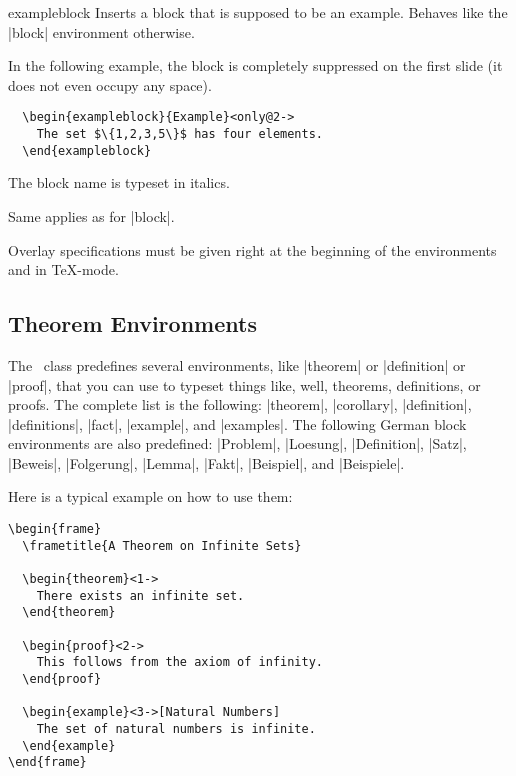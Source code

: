 \begin{environment}{{exampleblock}} 
  Inserts a block that is supposed to be an example. Behaves like the
  |block| environment otherwise.
  
  \example In the following example, the block is completely
  suppressed on the first slide (it does not even occupy any space).
\begin{verbatim}
  \begin{exampleblock}{Example}<only@2->
    The set $\{1,2,3,5\}$ has four elements.
  \end{exampleblock}
\end{verbatim}

  \articlenote
  The block name is typeset in italics.

  \lyxnote
  Same applies as for |block|.
\end{environment}

\lyxnote
Overlay specifications must be given right at the beginning of the
environments and in \TeX-mode.



\subsection{Theorem Environments}
\label{section-theorems}

The \beamer\ class predefines several environments, like |theorem| or
|definition| or |proof|, that you can use to typeset things like,
well, theorems, definitions, or proofs. The complete list is the
following:  |theorem|, |corollary|, |definition|,
|definitions|, |fact|, |example|, and |examples|. The following German
block environments are also predefined: |Problem|, |Loesung|,
|Definition|, |Satz|, |Beweis|, |Folgerung|, |Lemma|, |Fakt|,
|Beispiel|, and |Beispiele|.

Here is a typical example on how to use them:

\begin{verbatim}
\begin{frame}
  \frametitle{A Theorem on Infinite Sets}

  \begin{theorem}<1->
    There exists an infinite set.
  \end{theorem}

  \begin{proof}<2->
    This follows from the axiom of infinity.
  \end{proof}

  \begin{example}<3->[Natural Numbers]
    The set of natural numbers is infinite.
  \end{example}
\end{frame}
\end{verbatim}

